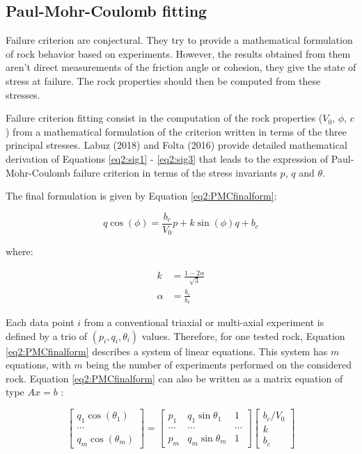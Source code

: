 \subsection{Paul-Mohr-Coulomb fitting }\label{ch2:pmcfit}

Failure criterion are conjectural. They try to provide a mathematical formulation of rock behavior based on experiments. However, the results obtained from them aren’t direct measurements of the friction angle or cohesion, they give the state of stress at failure. The rock properties should then be computed from these stresses.

Failure criterion fitting consist in the computation of the rock properties ($V_0$, $\phi$, $c$ ) from a mathematical formulation of the criterion written in terms of the three principal stresses. Labuz (2018) \cite{Labuz2018} and Folta (2016) \cite{Folta2016} provide detailed mathematical derivation of Equations \ref{eq2:sig1} - \ref{eq2:sig3} that leads to the expression of Paul-Mohr-Coulomb failure criterion in terms of the stress invariants $p$, $q$  and $\theta$. 

The final formulation is given by Equation \ref{eq2:PMCfinalform}:

\begin{equation}\label{eq2:PMCfinalform}
    q\cos(\phi) = \frac{b_c}{V_0}p+k\sin(\phi)q+b_c
\end{equation}

where:

\begin{align}
    k &= \frac{1-2\alpha }{\sqrt{3}}\\
    \alpha &= \frac{b_c}{b_e}
\end{align}

Each data point $i$ from a conventional triaxial or multi-axial experiment is defined by a trio of $(p_i,q_i,\theta_i)$ values. Therefore, for one tested rock, Equation \ref{eq2:PMCfinalform} describes a system of linear equations. This system has $m$  equations, with $m$ being the number of experiments performed on the considered rock. Equation \ref{eq2:PMCfinalform} can also be written as a matrix equation of type $Ax=b$ :

\begin{equation}\label{eq2:mat-eq}
    \left[\begin{array}{c}
    {q_{1} \cos \left(\theta_{1}\right)} \\
    {\cdots} \\
    {q_{m} \cos \left(\theta_{m}\right)}
    \end{array}\right]=\left[\begin{array}{ccc}
    {p_{1}} & {q_{1} \sin \theta_{1}} & {1} \\
    {\cdots} & {\cdots} & {\cdots} \\
    {p_{m}} & {q_{m} \sin \theta_{m}} & {1}
    \end{array}\right]\left[\begin{array}{c}
    {b_{c} / V_{0}} \\
    {k} \\
    {b_{c}}
    \end{array}\right]
\end{equation}

